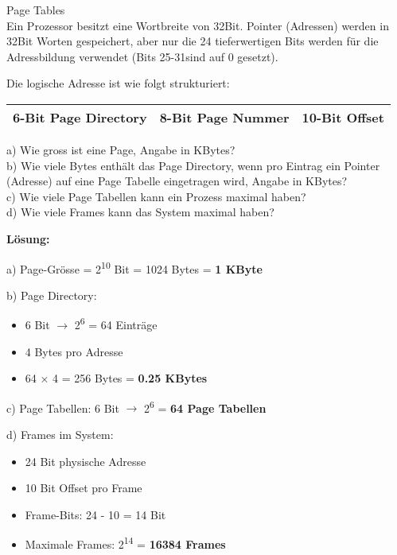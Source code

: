 \begin{example2}{Page Tables}\\
    Ein Prozessor besitzt eine Wortbreite von 32Bit. Pointer (Adressen) werden in 32Bit Worten gespeichert, aber nur die 24 tieferwertigen Bits werden für die Adressbildung verwendet (Bits 25-31sind auf 0 gesetzt).
    
    Die logische Adresse ist wie folgt strukturiert:
    \begin{center}
    \begin{tabular}{|c|c|c|}
    \hline
    6-Bit Page Directory & 8-Bit Page Nummer & 10-Bit Offset \\
    \hline
    \end{tabular}
    \end{center}
    
    a) Wie gross ist eine Page, Angabe in KBytes?\\
    b) Wie viele Bytes enthält das Page Directory, wenn pro Eintrag ein Pointer (Adresse) auf eine Page Tabelle eingetragen wird, Angabe in KBytes?\\
    c) Wie viele Page Tabellen kann ein Prozess maximal haben?\\
    d) Wie viele Frames kann das System maximal haben?
    
    \tcblower
    \begin{minipage}{0.5\linewidth}
    \textbf{Lösung:}
    
    a) Page-Grösse = 2\textsuperscript{10} Bit = 1024 Bytes = \textbf{1 KByte}
    
    b) Page Directory:
    \begin{itemize}
        \item 6 Bit $\rightarrow$ 2\textsuperscript{6} = 64 Einträge
        \item 4 Bytes pro Adresse
        \item 64 × 4 = 256 Bytes = \textbf{0.25 KBytes}
    \end{itemize}
    \end{minipage}
    \begin{minipage}{0.5\linewidth}    
    c) Page Tabellen: 6 Bit $\rightarrow$ 2\textsuperscript{6} = \textbf{64 Page Tabellen}
    
    d) Frames im System:
    \begin{itemize}
        \item 24 Bit physische Adresse
        \item 10 Bit Offset pro Frame
        \item Frame-Bits: 24 - 10 = 14 Bit
        \item Maximale Frames: 2\textsuperscript{14} = \textbf{16384 Frames}
    \end{itemize}
    \end{minipage}
\end{example2}



